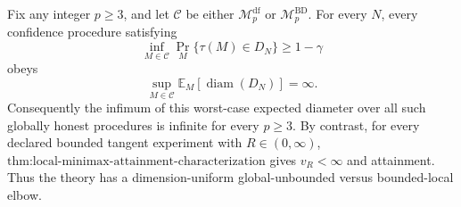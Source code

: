 Fix any integer \(p\ge3\), and let \(\mathcal C\) be either \(\mathcal M_p^{\mathrm{df}}\) or \(\mathcal M_p^{\mathrm{BD}}\).  For every \(N\), every confidence procedure satisfying
\[
 \inf_{M\in\mathcal C}\Pr_M\{\tau(M)\in D_N\}\ge1-\gamma
\]
obeys
\[
 \sup_{M\in\mathcal C}\mathbb E_M\!\left[\operatorname{diam}(D_N)\right]=\infty.
\]
Consequently the infimum of this worst-case expected diameter over all such globally honest procedures is infinite for every \(p\ge3\).  By contrast, for every declared bounded tangent experiment with \(R\in(0,\infty)\), \(\text{thm:local-minimax-attainment-characterization}\) gives \(v_R<\infty\) and attainment.  Thus the theory has a dimension-uniform global-unbounded versus bounded-local elbow.